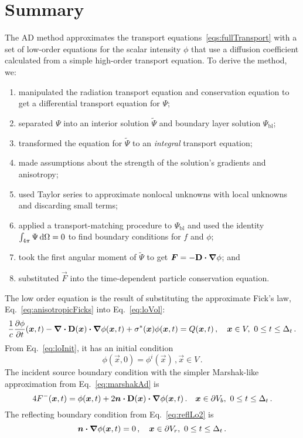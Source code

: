 \section{Summary}
The AD method approximates the transport equations~\eqref{eqs:fullTransport}
with a set of
low-order equations for the scalar intensity $\phi$ that use a diffusion
coefficient calculated from a simple high-order transport equation.
To derive the method, we:
\begin{enumerate}
  \item manipulated the radiation transport equation and conservation equation
    to get a differential transport equation for $\Psi$;
  \item separated $\Psi$ into an interior solution $\tilde \Psi$ and boundary
    layer solution $\Psi_\mathrm{bl}$;
  \item transformed the equation for $\tilde \Psi$ to an \emph{integral}
    transport equation;
  \item made assumptions about the strength of the solution's gradients and
    anisotropy;
  \item used Taylor series to approximate nonlocal unknowns with local
    unknowns and discarding small terms;
  \item applied a transport-matching procedure to $\Psi_\mathrm{bl}$ 
    and used the identity $\int_{4\pi} \Psi \mathop{}\!\mathrm{d}\Omega=0$ to find boundary
    conditions for $f$ and $\phi$;
  \item took the first angular moment of $\tilde \Psi$ to get
    $\bm{F}=-\mathbf{D} \bm{\cdot} \bm{\nabla} \phi$; and
  \item substituted $\vec{F}$ into the time-dependent particle conservation
    equation.
\end{enumerate}

The low order equation is the result of substituting the approximate Fick's law,
Eq.~\eqref{eq:anisotropicFicks} into Eq.~\eqref{eq:loVol}:
\begin{equation*}
\frac{1}{c} \frac{\partial \phi}{\partial t} (\bm{x}, t)
  - \bm{\nabla} \bm{\cdot} \mathbf{D}(\bm{x}) \bm{\cdot} \bm{\nabla} \phi(\bm{x},t)
  + \sigma^\ast(\bm{x}) \phi(\bm{x}, t)
  = Q(\bm{x}, t) \,,
  \quad \bm{x} \in V,\ 0 \le t \le \Delta_t \,.
\end{equation*}
From Eq.~\eqref{eq:loInit}, it has an initial condition
\begin{equation*}
\phi(\vec{x}, 0) = \phi^i(\vec{x})\,, \vec{x} \in V  \,.
\end{equation*}
The incident source boundary condition with the simpler Marshak-like
approximation from Eq.~\eqref{eq:marshakAd} is
\begin{equation*}
  4 F^-(\bm{x}, t)
  = \phi(\bm{x}, t)
  + 2 \bm{n} \bm{\cdot} \mathbf{D}(\bm{x}) \bm{\cdot} \bm{\nabla} \phi(\bm{x}, t) \,.
 \quad \bm{x} \in \partial V_b,\ 0 \le t \le \Delta_t \,.
\end{equation*}
The reflecting boundary condition from Eq.~\eqref{eq:reflLo2} is
\begin{equation*}
  \bm{n}\bm{\cdot}\bm{\nabla} \phi(\bm{x}, t) = 0 \,,
 \quad \bm{x} \in \partial V_r,\ 0 \le t \le \Delta_t \,.
\end{equation*}

